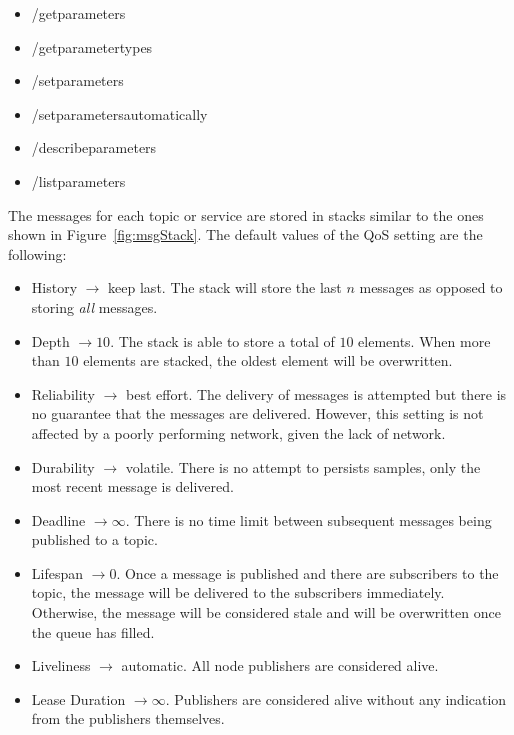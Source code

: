     \begin{itemize}
        \item \textsf{/get\smallunderscore parameters}
        \item \textsf{/get\smallunderscore parameter\smallunderscore types}
        \item \textsf{/set\smallunderscore parameters}
        \item \textsf{/set\smallunderscore parameters\smallunderscore automatically}
        \item \textsf{/describe\smallunderscore parameters}
        \item \textsf{/list\smallunderscore parameters}
    \end{itemize}


    The messages for each topic or service are stored in stacks similar to the ones shown in Figure~\ref{fig:msgStack}. The default values of the \ac{QoS} setting are the following:

    \begin{itemize}
        \item History $\rightarrow$ keep last. The stack will store the last $n$ messages as opposed to storing \textit{all} messages.
        \item Depth $\rightarrow 10$. The stack is able to store a total of $10$ elements. When more than $10$ elements are stacked, the oldest element will be overwritten.
        \item Reliability $\rightarrow$ best effort. The delivery of messages is attempted but there is no guarantee that the messages are delivered. However, this setting is not affected by a poorly performing network, given the lack of network.
        \item Durability $\rightarrow$ volatile. There is no attempt to persists samples, only the most recent message is delivered.
        \item Deadline $\rightarrow \infty$. There is no time limit between subsequent messages being published to a topic.
        \item Lifespan $\rightarrow 0$. Once a message is published and there are subscribers to the topic, the message will be delivered to the subscribers immediately. Otherwise, the message will be considered stale and will be overwritten once the queue has filled. 
        \item Liveliness $\rightarrow$ automatic. All node publishers are considered alive.
        \item Lease Duration $\rightarrow \infty$. Publishers are considered alive without any indication from the publishers themselves. 
    \end{itemize}


